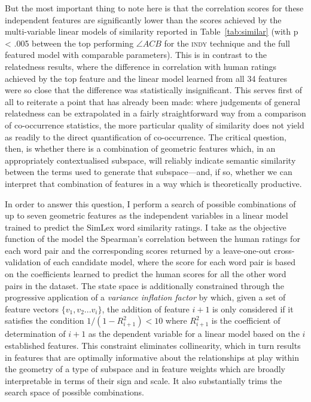But the most important thing to note here is that the correlation scores for these independent features are significantly lower than the scores achieved by the multi-variable linear models of similarity reported in Table~\ref{tab:similar} (with p < .005 between the top performing $\angle ACB$ for the \textsc{indy} technique and the full featured model with comparable parameters).  This is in contrast to the relatedness results, where the difference in correlation with human ratings achieved by the top feature and the linear model learned from all 34 features were so close that the difference was statistically insignificant.  This serves first of all to reiterate a point that has already been made: where judgements of general relatedness can be extrapolated in a fairly straightforward way from a comparison of co-occurrence statistics, the more particular quality of similarity does not yield as readily to the direct quantification of co-occurrence.  The critical question, then, is whether there is a combination of geometric features which, in an appropriately contextualised subspace, will reliably indicate semantic similarity between the terms used to generate that subspace---and, if so, whether we can interpret that combination of features in a way which is theoretically productive.

In order to answer this question, I perform a search of possible combinations of up to seven geometric features as the independent variables in a linear model trained to predict the SimLex word similarity ratings.  I take as the objective function of the model the Spearman's correlation between the human ratings for each word pair and the corresponding scores returned by a leave-one-out cross-validation of each candidate model, where the score for each word pair is based on the coefficients learned to predict the human scores for all the other word pairs in the dataset.  The state space is additionally constrained through the progressive application of a \emph{variance inflation factor} \citep{OBrien2007} by which, given a set of feature vectors $\{v_1,v_2... v_i\}$, the addition of feature $i+1$ is only considered if it satisfies the condition $1/(1-R_{i+1}^{2}) < 10$ where $R_{i+1}^2$ is the coefficient of determination of $i+1$ as the dependent variable for a linear model based on the $i$ established features.  This constraint eliminates collinearity, which in turn results in features that are optimally informative about the relationships at play within the geometry of a type of subspace and in feature weights which are broadly interpretable in terms of their sign and scale.  It also substantially trims the search space of possible combinations.

